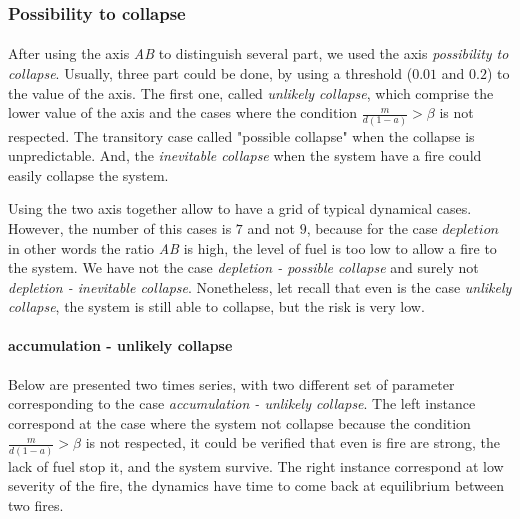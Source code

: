 \documentclass{article}
\begin{document}

\newpage

\subsubsection{Possibility to collapse}


\paragraph{} %
After using the axis \textit{AB} to distinguish several part, we used the axis \textit{possibility to collapse}. Usually, three part could be done, by using a threshold ($0.01$ and $0.2$) to the value of the axis. The first one, called \textit{unlikely collapse}, which comprise the lower value of the axis and the cases where the condition $\frac{m}{d( 1-a)} > \beta$ is not respected. The transitory case called "possible collapse" when the collapse is unpredictable. And, the \textit{inevitable collapse} when the system have a fire could easily collapse the system.

Using the two axis together allow to have a grid of typical dynamical cases. However, the number of this cases is $7$ and not $9$, because for the case $depletion$ in other words the ratio \textit{AB} is high, the level of fuel is too low to allow a fire to  the system. We have not the case \textit{depletion - possible collapse} and surely not \textit{depletion - inevitable collapse}. Nonetheless, let recall that even is the case \textit{unlikely collapse}, the system is still able to collapse, but the risk is very low.




\paragraph{accumulation - unlikely collapse\\}
Below are presented two times series, with two different set of parameter corresponding to the case \textit{accumulation - unlikely collapse}. The left instance correspond at the case where the system not collapse because the condition $\frac{m}{d( 1-a)} > \beta$ is not respected, it could be verified that even is fire are strong, the lack of fuel stop it, and the system survive. The right instance correspond at low severity of the fire, the dynamics have time to come back at equilibrium between two fires.
\end{document}
